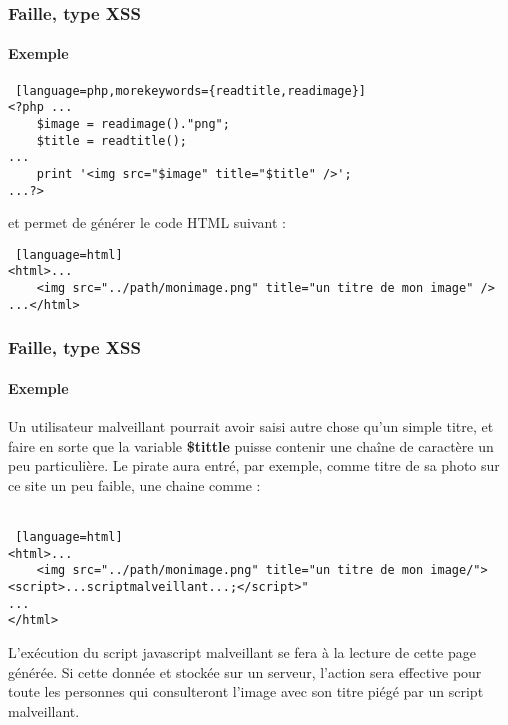 \begin{frame}[containsverbatim]
\frametitle<presentation>{Faille, type XSS}
\framesubtitle<presentation>{Exemple}
\begin{lstlisting} [language=php,morekeywords={readtitle,readimage}]
<?php ...
	$image = readimage()."png";
	$title = readtitle();
...
	print '<img src="$image" title="$title" />';
...?>
\end{lstlisting}

et permet de générer le code HTML suivant : \\

\begin{lstlisting} [language=html]
<html>...
	<img src="../path/monimage.png" title="un titre de mon image" />
...</html>
\end{lstlisting}
\end{frame}




\begin{frame}[containsverbatim]
\frametitle<presentation>{Faille, type XSS}
\framesubtitle<presentation>{Exemple}
Un utilisateur malveillant pourrait avoir saisi autre chose qu'un simple titre, et faire en sorte que la variable \textbf{\$tittle} puisse contenir une chaîne de caractère un peu particulière. Le pirate aura entré, par exemple, comme titre de sa photo sur ce site un peu faible, une chaine comme  : \\
\\
\begin{lstlisting} [language=html]
<html>...
	<img src="../path/monimage.png" title="un titre de mon image/"><script>...scriptmalveillant...;</script>" 
...
</html>
\end{lstlisting}

\end{frame}



L'exécution du script javascript malveillant se fera à la lecture de cette page générée. Si cette donnée et stockée sur un serveur, l'action sera effective pour toute les personnes qui consulteront l'image avec son titre piégé par un script malveillant.

